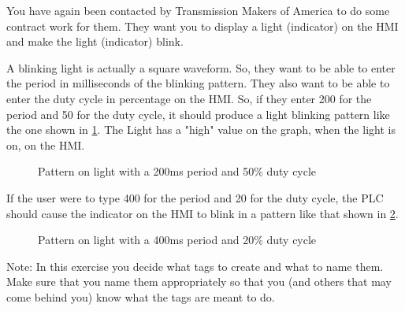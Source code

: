 You have again been contacted by Transmission Makers of America to do some contract work for them. They want you to display a light (indicator) on the HMI and make the light (indicator) blink. 

A blinking light is actually a square waveform. So, they want to be able to enter the period in milliseconds of the blinking pattern. They also want to be able to enter the duty cycle in percentage on the HMI. So, if they enter 200 for the period and 50 for the duty cycle, it should produce a light blinking pattern like the one shown in \figureautorefname \ref{fig:Blink20050}. The Light has a "high" value on the graph, when the light is on, on the HMI.

\begin{figure}
\caption{Pattern on light with a 200ms period and 50\% duty cycle}
\label{fig:Blink20050}
\end{figure}

If the user were to type 400 for the period and 20 for the duty cycle, the PLC should cause the indicator on the HMI to blink in a pattern like that shown in \figureautorefname \ref{fig:Blink40020}.

\begin{figure}
\caption{Pattern on light with a 400ms period and 20\% duty cycle}
\label{fig:Blink40020}
\end{figure}

Note: In this exercise you decide what tags to create and what to name them. Make sure that you name them appropriately so that you (and others that may come behind you) know what the tags are meant to do.

